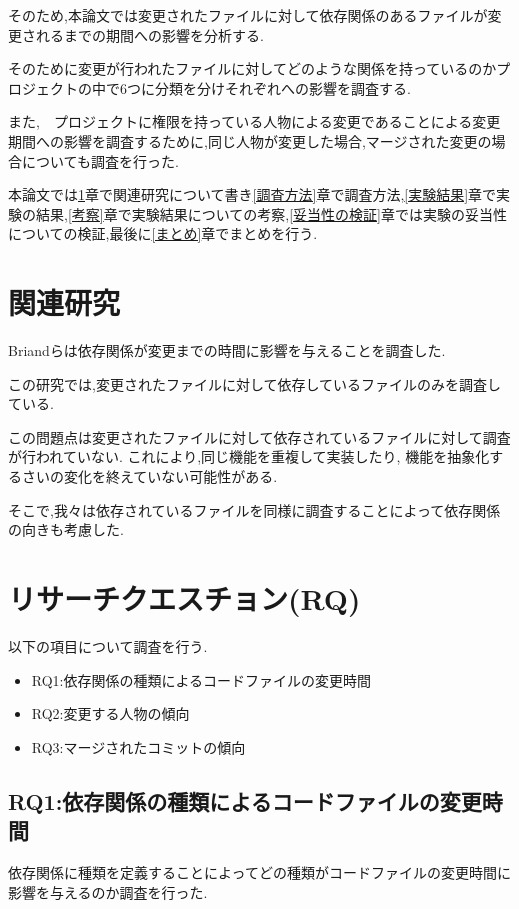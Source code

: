 \documentclass[submit,ses,noauthor]{ipsj} %
\begin{document}
そのため,本論文では変更されたファイルに対して依存関係のあるファイルが変更されるまでの期間への影響を分析する.

そのために変更が行われたファイルに対してどのような関係を持っているのかプロジェクトの中で6つに分類を分けそれぞれへの影響を調査する.

また,　プロジェクトに権限を持っている人物による変更であることによる変更期間への影響を調査するために,同じ人物が変更した場合,マージされた変更の場合についても調査を行った.


本論文では\ref{関連研究}章で関連研究について書き\ref{調査方法}章で調査方法,\ref{実験結果}章で実験の結果,\ref{考察}章で実験結果についての考察,\ref{妥当性の検証}章では実験の妥当性についての検証,最後に\ref{まとめ}章でまとめを行う.


\section{関連研究}\label{関連研究}

Briand\cite{Briand}らは依存関係が変更までの時間に影響を与えることを調査した.

この研究では,変更されたファイルに対して依存しているファイルのみを調査している.

この問題点は変更されたファイルに対して依存されているファイルに対して調査が行われていない.
これにより,同じ機能を重複して実装したり, 機能を抽象化するさいの変化を終えていない可能性がある.

そこで,我々は依存されているファイルを同様に調査することによって依存関係の向きも考慮した.


\section{リサーチクエスチョン(RQ)}\label{リサーチクエスチョン}
以下の項目について調査を行う.
\begin{itemize}
\item RQ1:依存関係の種類によるコードファイルの変更時間
\item RQ2:変更する人物の傾向
\item RQ3:マージされたコミットの傾向
\end{itemize}

\subsection{RQ1:依存関係の種類によるコードファイルの変更時間}
依存関係に種類を定義することによってどの種類がコードファイルの変更時間に影響を与えるのか調査を行った.
\end{document}
